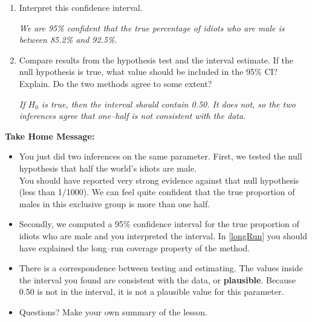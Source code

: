 \begin{enumerate}
\begin{enumerate}
\begin{key} 
  {\it Our confidence is in the process, not in just one interval. If
    we repeat the process (gather a new random sample) over and over,
    95\% of the intervals we create will include the true parameter of
  interest.}
\end{key}

  \end{enumerate}
\item Interpret this confidence interval.
\begin{students}
    \vspace{2cm}    
\end{students}

\begin{key} 
  {\it We are 95\% confident that the true percentage of idiots who
    are male is between 85.2\% and 92.5\%.}
\end{key}


\item Compare results from the hypothesis test and the interval
  estimate.  If the null hypothesis is true, what value should be
  included in the 95\% CI?  Explain. Do the two methods agree to some
  extent? 
\begin{students}
    \vspace{2.5cm}    
\end{students}

\begin{key} 
  {\it  If $H_0$ is true, then the interval should contain 0.50.  It
    does not, so the two inferences agree that one--half is not
    consistent with the data.} 
\end{key}
\end{enumerate}


\begin{center}
  {\bf Take Home Message:} \vspace{-.3in}
\end{center}
\begin{itemize}
  \item You just did two inferences on the same parameter.  First, we
    tested the null hypothesis that half the world's idiots are
    male.\\
      You should have reported very strong evidence against that null
      hypothesis (less than 1/1000). We can feel quite confident that
      the true proportion 
      of males in this exclusive group is more than one half.

  \item Secondly, we computed a 95\% confidence interval for the true
    proportion of idiots who are male and you interpreted the
    interval.  In \ref{longRun} you should have explained the
    long--run coverage property of the method.
  \item   There is a correspondence
    between testing and estimating.  The values inside the interval
    you found are consistent with the data, or {\bf plausible}.  Because
    0.50 is not in the interval, it is not a plausible value for this
    parameter. 
 \item 
  Questions? Make your own summary of the  lesson. 
\end{itemize}

